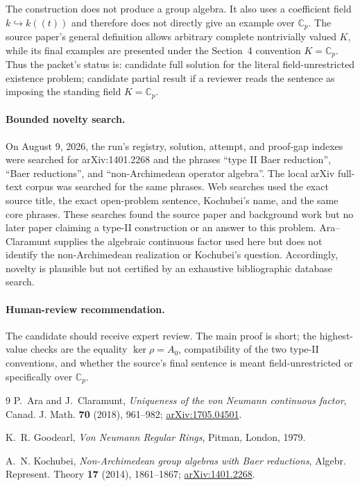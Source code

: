 \documentclass[11pt]{article}
\begin{document}
The construction does not produce a group algebra.  It also uses a
coefficient field $k\hookrightarrow k((t))$ and therefore does not directly
give an example over $\mathbb C_p$.  The source paper's general definition
allows arbitrary complete nontrivially valued $K$, while its final examples
are presented under the Section~4 convention $K=\mathbb C_p$.  Thus the
packet's status is: candidate full solution for the literal
field-unrestricted existence problem; candidate partial result if a
reviewer reads the sentence as imposing the standing field
$K=\mathbb C_p$.

\paragraph{Bounded novelty search.}
On August 9, 2026, the run's registry, solution, attempt, and proof-gap
indexes were searched for arXiv:1401.2268 and the phrases ``type II Baer
reduction'', ``Baer reductions'', and ``non-Archimedean operator algebra''.
The local arXiv full-text corpus was searched for the same phrases.  Web
searches used the exact source title, the exact open-problem sentence,
Kochubei's name, and the same core phrases.  These searches found the
source paper and background work but no later paper claiming a type-II
construction or an answer to this problem.  Ara--Claramunt
\cite{AraClaramunt} supplies the algebraic continuous factor used here but
does not identify the non-Archimedean realization or Kochubei's question.
Accordingly, novelty is plausible but not certified by an exhaustive
bibliographic database search.

\paragraph{Human-review recommendation.}
The candidate should receive expert review.  The main proof is short; the
highest-value checks are the equality $\ker\rho=A_0$, compatibility of the
two type-II conventions, and whether the source's final sentence is meant
field-unrestricted or specifically over $\mathbb C_p$.

\begin{thebibliography}{9}
P.~Ara and J.~Claramunt,
\emph{Uniqueness of the von Neumann continuous factor},
Canad. J. Math. \textbf{70} (2018), 961--982;
\href{https://arxiv.org/abs/1705.04501}{arXiv:1705.04501}.

K.~R. Goodearl,
\emph{Von Neumann Regular Rings},
Pitman, London, 1979.

A.~N. Kochubei,
\emph{Non-Archimedean group algebras with Baer reductions},
Algebr. Represent. Theory \textbf{17} (2014), 1861--1867;
\href{https://arxiv.org/abs/1401.2268}{arXiv:1401.2268}.
\end{thebibliography}
\end{document}
